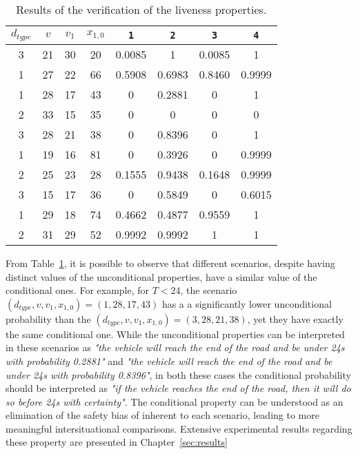 \bgroup
\def\arraystretch{1.3}
\begin{table}[h]
\centering
\begin{tabular}{|c|c|c|c||c|c||c|c|}
\hline
\textbf{$d_{type}$} & \textbf{$v$} & \textbf{$v_1$} & \textbf{$x_{1,0}$} & \texttt{1} & \texttt{2} & \texttt{3} & \texttt{4}  \\ \hline \hline
3 & 21 & 30 & 20 & 0.0085 & 1 & 0.0085 & 1 \\ \hline
1 & 27 & 22 & 66 & 0.5908 & 0.6983 & 0.8460 & 0.9999 \\ \hline
1 & 28 & 17 & 43 & 0 & 0.2881 & 0 & 1 \\ \hline
2 & 33 & 15 & 35 & 0 & 0 & 0 & 0 \\ \hline
3 & 28 & 21 & 38 & 0 & 0.8396 & 0 & 1 \\ \hline
1 & 19 & 16 & 81 & 0 & 0.3926 & 0 & 0.9999 \\ \hline
2 & 25 & 23 & 28 & 0.1555 & 0.9438 & 0.1648 & 0.9999 \\ \hline
3 & 15 & 17 & 36 & 0 & 0.5849 & 0 & 0.6015 \\ \hline
1 & 29 & 18 & 74 & 0.4662 & 0.4877 & 0.9559 & 1 \\ \hline
2 & 31 & 29 & 52 & 0.9992 & 0.9992 & 1 & 1 \\ \hline
\end{tabular}
\caption{Results of the verification of the liveness properties.}
\label{tab:liveness}
\end{table}
\egroup

From Table~\ref{tab:liveness}, it is possible to observe that different scenarios, despite having distinct values of the unconditional properties, have a similar value of the conditional ones. For example, for $T < 24$, the scenario $(d_{type}, v, v_1, x_{1,0}) = (1, 28, 17, 43)$ has a a significantly lower unconditional probability than the $(d_{type}, v, v_1, x_{1,0}) = (3, 28, 21, 38)$, yet they have exactly the same conditional one. While the unconditional properties can be interpreted in these scenarios as \textit{"the vehicle will reach the end of the road and be under 24s with probability 0.2881"} and \textit{"the vehicle will reach the end of the road and be under 24s with probability 0.8396"},  in both these cases the conditional probability should be interpreted as \textit{"if the vehicle reaches the end of the road, then it will do so before 24s with certainty"}. The conditional property can be understood as an elimination of the safety bias of inherent to each scenario, leading to more meaningful intersituational comparisons. Extensive experimental results regarding these property are presented in Chapter~\ref{sec:results}

